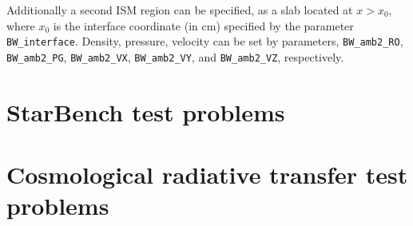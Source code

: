 \documentclass[a4paper,11pt]{report}
\begin{document}
Additionally a second ISM region can be specified, as a slab located at $x>x_0$, where $x_0$ is the interface coordinate (in cm) specified by the parameter \lstinline|BW_interface|.
Density, pressure, velocity can be set by parameters, \lstinline|BW_amb2_RO|, \lstinline|BW_amb2_PG|, \lstinline|BW_amb2_VX|, \lstinline|BW_amb2_VY|, and \lstinline|BW_amb2_VZ|, respectively.

\section{StarBench test problems}

\section{Cosmological radiative transfer test problems}



%

\end{document}
